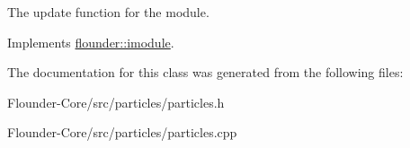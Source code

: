 The update function for the module. 



Implements \hyperlink{classflounder_1_1imodule_a9a53d48a46b5f6b16a92b2cd8503f74a}{flounder\+::imodule}.



The documentation for this class was generated from the following files\+:\begin{DoxyCompactItemize}
\item 
Flounder-\/\+Core/src/particles/particles.\+h\item 
Flounder-\/\+Core/src/particles/particles.\+cpp\end{DoxyCompactItemize}
